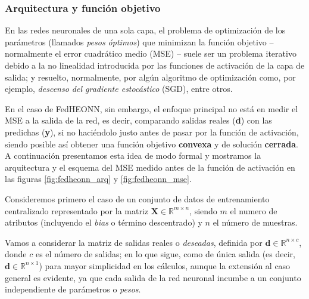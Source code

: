 \documentclass[00-Trabajo_Final.tex]{subfiles}
\begin{document}
\subsubsection{Arquitectura y función objetivo}
En las redes neuronales de una sola capa, el problema de optimización de los parámetros (llamados \textit{pesos óptimos}) que minimizan la función objetivo{ }--{ }normalmente el error cuadrático medio (MSE){ }--{ }suele ser un problema iterativo debido a la no linealidad introducida por las funciones de activación de la capa de salida; y resuelto, normalmente, por algún algoritmo de optimización como, por ejemplo, \textit{descenso del gradiente estocástico} (SGD), entre otros.

En el caso de FedHEONN, sin embargo, el enfoque principal no está en medir el MSE a la salida de la red, es decir, comparando salidas reales (\textbf{d}) con las predichas (\textbf{y}), si no haciéndolo justo antes de pasar por la función de activación, siendo posible así obtener una función objetivo \textbf{convexa} y de solución \textbf{cerrada}. A continuación presentamos esta idea de modo formal y mostramos la arquitectura y el esquema del MSE medido antes de la función de activación en las figuras \ref{fig:fedheonn_arq} y \ref{fig:fedheonn_mse}.

\vspace{0.5em}

Consideremos primero el caso de un conjunto de datos de entrenamiento centralizado representado por la matriz $\boldsymbol{X} \in \mathbb{R}^{m \times n}$, siendo $m$ el numero de atributos (incluyendo el \textit{bias} o término descentrado) y $n$ el número de muestras.

\vspace{0.5em}

Vamos a considerar la matriz de salidas reales o \textit{deseadas}, definida por $\boldsymbol{d} \in \mathbb{R}^{n \times c}$, donde $c$ es el número de salidas; en lo que sigue, como de única salida (es decir, $\boldsymbol{d} \in \mathbb{R}^{n \times 1}$) para mayor simplicidad en los cálculos, aunque la extensión al caso general es evidente, ya que cada salida de la red neuronal incumbe a un conjunto independiente de parámetros o \textit{pesos}.

\vspace{0.5em}
\end{document}
